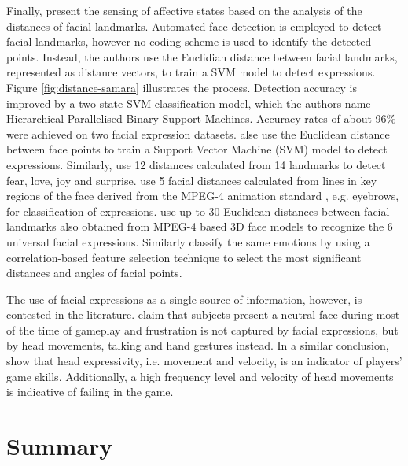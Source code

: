 Finally, \textcite{samara2016sensing} present the sensing of affective states based on the analysis of the distances of facial landmarks. Automated face detection is employed to detect facial landmarks, however no coding scheme is used to identify the detected points. Instead, the authors use the Euclidian distance between facial landmarks, represented as distance vectors, to train a SVM model to detect expressions. Figure \ref{fig:distance-samara} illustrates the process. Detection accuracy is improved by a two-state SVM classification model, which the authors name Hierarchical Parallelised Binary Support Machines. Accuracy rates of about 96\% were achieved on two facial expression datasets. \textcite{samara2016sensing} alse use the Euclidean distance between face points to train a Support Vector Machine (SVM) model to detect expressions. Similarly, \textcite{chang2009emotion} use 12 distances calculated from 14 landmarks to detect fear, love, joy and surprise. \textcite{hammal2007facial} use 5 facial distances calculated from lines in key regions of the face derived from the MPEG-4 animation standard \parencite{abrantes1999mpeg}, e.g. eyebrows, for classification of expressions. \textcite{tang20083d,tang2008line} use up to 30 Euclidean distances between facial landmarks also obtained from MPEG-4 based 3D face models to recognize the 6 universal facial expressions. Similarly \textcite{hupont2013facial} classify the same emotions by using a correlation-based feature selection technique to select the most significant distances and angles of facial points.

The use of facial expressions as a single source of information, however, is contested in the literature. \textcite{blom2014towards} claim that subjects present a neutral face during most of the time of gameplay and frustration is not captured by facial expressions, but by head movements, talking and hand gestures instead. In a similar conclusion, \textcite{shaker2011game} show that head expressivity, i.e. movement and velocity, is an indicator of players' game skills. Additionally, a high frequency level and velocity of head movements is indicative of failing in the game.

\section{Summary}
\label{sec:literature-face-summary}

